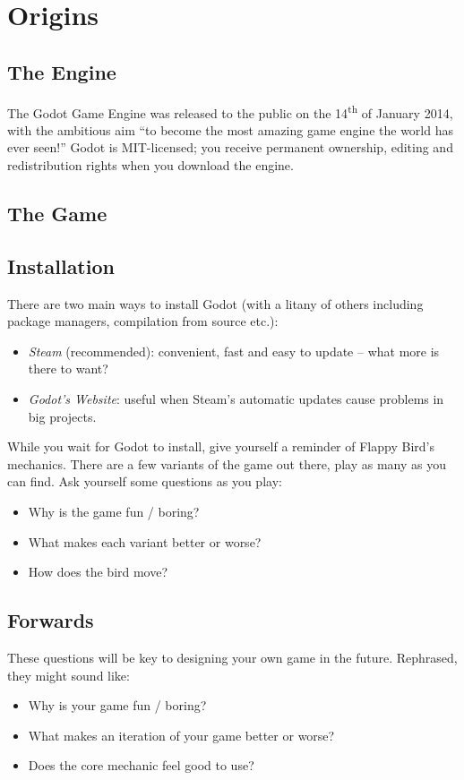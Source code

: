 \documentclass[14pt]{extarticle}
\begin{document}


\section{Origins}
\subsection*{The Engine}
The Godot Game Engine was released to the public on the 14\textsuperscript{th} of January 2014, with the ambitious aim ``to become the most amazing game engine the world has ever seen!''\cite{first-public-release-godot} Godot is MIT-licensed; you receive permanent ownership, editing and redistribution rights when you download the engine.

\subsection*{The Game}

\subsection*{Installation}
There are two main ways to install Godot (with a litany of others including package managers, compilation from source etc.):
\begin{itemize}
  \item[--] \emph{Steam} (recommended): convenient, fast and easy to update -- what more is there to want?
  \item[--] \emph{Godot's Website}: useful when Steam's automatic updates cause problems in big projects.
\end{itemize}
While you wait for Godot to install, give yourself a reminder of Flappy Bird's mechanics. There are a few variants of the game out there, play as many as you can find. Ask yourself some questions as you play:
\begin{itemize}
  \item[--] Why is the game fun / boring?
  \item[--] What makes each variant better or worse?
  \item[--] How does the bird move?
\end{itemize}

\subsection*{Forwards}
These questions will be key to designing your own game in the future. Rephrased, they might sound like:
\begin{itemize}
  \item[--] Why is your game fun / boring?
  \item[--] What makes an iteration of your game better or worse?
  \item[--] Does the core mechanic feel good to use?
\end{itemize}

\clearpage


\end{document}
